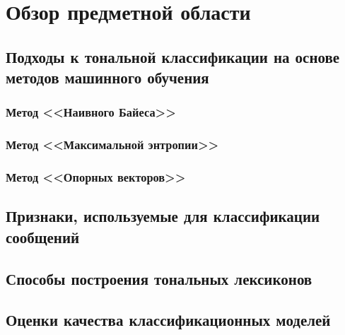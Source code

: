 \newpage
\section{Обзор предметной области}

    \subsection{Подходы к тональной классификации на основе методов машинного обучения}
        \subsubsection{Метод <<Наивного Байеса>>}

        \subsubsection{Метод <<Максимальной энтропии>>}
        \subsubsection{Метод <<Опорных векторов>>}

    \subsection{Признаки, используемые для классификации сообщений}
    \subsection{Способы построения тональных лексиконов}

    \subsection{Оценки качества классификационных моделей}

